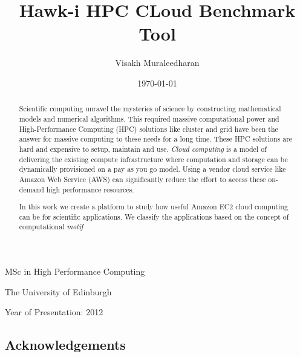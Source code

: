 \documentclass[12pt,a4paper]{report}
\begin{document}




\title{Hawk-i HPC CLoud Benchmark Tool}
\author{Visakh Muraleedharan}
\date{\today}

\makeEPCCtitle

\thispagestyle{empty}

\vspace{12cm}

\begin{center}

\large{MSc in High Performance Computing}

\large{The University of Edinburgh}

\large{Year of Presentation: 2012}

\end{center}

\newpage

\begin{abstract}
Scientific computing unravel the mysteries of science by constructing mathematical models and numerical algorithms. This required massive computational power and High-Performance Computing (HPC) solutions like cluster and grid have been the answer for massive computing to these needs for a long time. These HPC solutions are hard and expensive to setup, maintain and use. \emph{Cloud computing} is a model of delivering the existing compute infrastructure where computation and storage can be dynamically provisioned on a pay as you go model. Using a vendor cloud service like Amazon Web Service (AWS) can significantly reduce the effort to access these on-demand high performance resources.

In this work we create a platform to study how useful Amazon EC2 cloud computing can be for scientific applications. 
We classify the applications based on the concept of computational \emph{motif}\cite{asanovic2008parallel}  
\end{abstract}


\tableofcontents
\listoftables
\listoffigures

\begin{titlepage}
\vspace*{2in}
\section*{Acknowledgements}

\end{titlepage}
\end{document}
